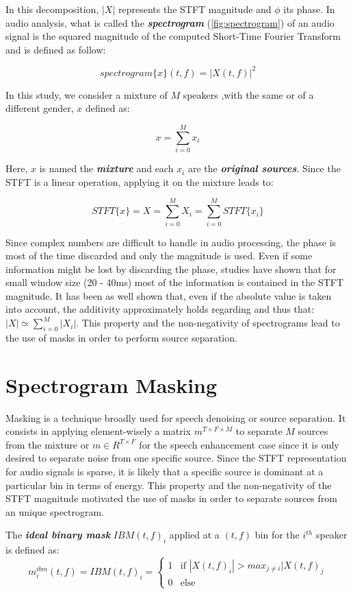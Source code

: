 \documentclass[master, tikz, final,11pt, dvipdfmx]{iscs-thesis}
\begin{document}
In this decomposition, $|X|$ represents the STFT magnitude and $\phi$ its phase. In audio analysis, what is called the \textit{\textbf{spectrogram}} (\autoref{fig:spectrogram}) of an audio signal is the squared magnitude of the computed Short-Time Fourier Transform and is defined as follow:

\[
	spectrogram\{x\}(t,f) =  |X(t,f)|^2
\]

In this study, we consider a mixture of $M$ speakers ,with the same or of a different gender, $x$ defined as:

\[
x = \sum_{i=0}^{M} x_i
\]

Here, $x$ is named the \textit{\textbf{mixture}} and each $x_i$ are the \textit{\textbf{original sources}}. Since the STFT is a linear operation, applying it on the mixture leads to:

\[
	STFT\{x\} = X = \sum_{i=0}^{M} X_i =\sum_{i=0}^{M} STFT\{x_i\}
\]

Since complex numbers are difficult to handle in audio processing, the phase is most of the time discarded and only the magnitude is used. Even if some information might be lost by discarding the phase, studies \cite{stft} have shown that for small window size (20 - 40ms) most of the information is contained in the STFT magnitude. It has been as well shown that, even if the absolute value is taken into account, the additivity approximately holds regarding and thus that: $|X| \simeq \sum_{i=0}^{M} |X_i|$. This property and the non-negativity of spectrograms lead to the use of masks in order to perform source separation.


\section{Spectrogram Masking}

Masking is a technique broadly used for speech denoising or source separation. It consists in applying element-wisely a matrix $m^{T \times F \times M}$ to separate $M$ sources from the mixture or $m \in R^{T \times F}$ for the speech enhancement case since it is only desired to separate noise from one specific source. Since the STFT representation for audio signals is sparse, it is likely that a specific source is dominant at a particular bin in terms of energy. This property and the non-negativity of the STFT magnitude motivated the use of masks in order to separate sources from an unique spectrogram.

The \textit{\textbf{ideal binary mask}} $IBM(t,f)_i$ applied at a $(t,f)$ bin for the $i^{th}$ speaker is defined as:
\[
m^{ibm}_i(t,f) = IBM(t,f)_i = \left\{
    \begin{array}{ll}
        1 & \mbox{if } |X(t,f)_i| > max_{j \neq i} |X(t,f)_j \\
        0 & \mbox{else}
    \end{array}
\right.
\]
\end{document}
